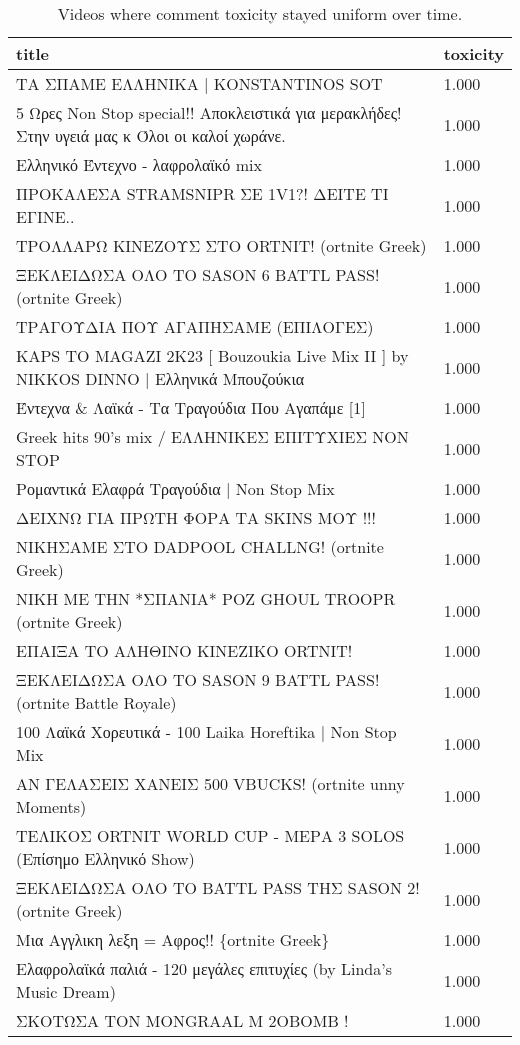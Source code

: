\begin{table}
\caption{Videos where comment toxicity stayed uniform over time.}
\label{tab::toxic_uniform}
\begin{tabular}{|p{10cm}|p{1cm}|}
\toprule
title & toxicity \\
\midrule
ΤΑ ΣΠΑΜΕ ΕΛΛΗΝΙΚΑ | KONSTANTINOS SOT & 1.000 \\
 5 Ωρες Non Stop special!!  Αποκλειστικά για μερακλήδες!  Στην υγειά μας κ Όλοι οι καλοί χωράνε. & 1.000 \\
Ελληνικό Έντεχνο - λαφρολαϊκό mix & 1.000 \\
ΠΡΟΚΑΛΕΣΑ STRAMSNIPR ΣΕ 1V1?! ΔΕΙΤΕ ΤΙ ΕΓΙΝΕ.. & 1.000 \\
ΤΡΟΛΛΑΡΩ ΚΙΝΕΖΟΥΣ ΣΤΟ ORTNIT! (ortnite Greek) & 1.000 \\
ΞΕΚΛΕΙΔΩΣΑ ΟΛΟ ΤΟ SASON 6 BATTL PASS! (ortnite Greek) & 1.000 \\
ΤΡΑΓΟΥΔΙΑ ΠΟΥ ΑΓΑΠΗΣΑΜΕ (ΕΠΙΛΟΓΕΣ) & 1.000 \\
KAPS TO MAGAZI 2K23 [ Bouzoukia Live Mix II ] by NIKKOS DINNO | Ελληνικά Μπουζούκια & 1.000 \\
Έντεχνα \& Λαϊκά - Τα Τραγούδια Που Αγαπάμε [1] & 1.000 \\
Greek hits 90's mix / ΕΛΛΗΝΙΚΕΣ ΕΠΙΤΥΧΙΕΣ NON STOP & 1.000 \\
Ρομαντικά Ελαφρά Τραγούδια | Non Stop Mix & 1.000 \\
ΔΕΙΧΝΩ ΓΙΑ ΠΡΩΤΗ ΦΟΡΑ ΤΑ SKINS ΜΟΥ !!! & 1.000 \\
ΝΙΚΗΣΑΜΕ ΣΤΟ DADPOOL CHALLNG! (ortnite Greek) & 1.000 \\
ΝΙΚΗ ΜΕ ΤΗΝ *ΣΠΑΝΙΑ* ΡΟΖ GHOUL TROOPR (ortnite Greek) & 1.000 \\
ΕΠΑΙΞΑ ΤΟ ΑΛΗΘΙΝΟ ΚΙΝΕΖΙΚΟ ORTNIT! & 1.000 \\
ΞΕΚΛΕΙΔΩΣΑ ΟΛΟ ΤΟ SASON 9 BATTL PASS! (ortnite Battle Royale) & 1.000 \\
100 Λαϊκά Χορευτικά - 100 Laika Horeftika | Non Stop Mix & 1.000 \\
ΑΝ ΓΕΛΑΣΕΙΣ ΧΑΝΕΙΣ 500 VBUCKS! (ortnite unny Moments) & 1.000 \\
ΤΕΛΙΚΟΣ ORTNIT WORLD CUP - ΜΕΡΑ 3 SOLOS (Επίσημο Ελληνικό Show) & 1.000 \\
ΞΕΚΛΕΙΔΩΣΑ ΟΛΟ ΤΟ BATTL PASS ΤΗΣ SASON 2! (ortnite Greek) & 1.000 \\
Μια Αγγλικη λεξη = Αφρος!! \{ortnite Greek\} & 1.000 \\
Ελαφρολαϊκά παλιά - 120 μεγάλες επιτυχίες (by Linda's Music Dream) & 1.000 \\
ΣΚΟΤΩΣΑ ΤΟΝ MONGRAAL M 2OBOMB ! & 1.000 \\

\end{tabular}
\end{table}
